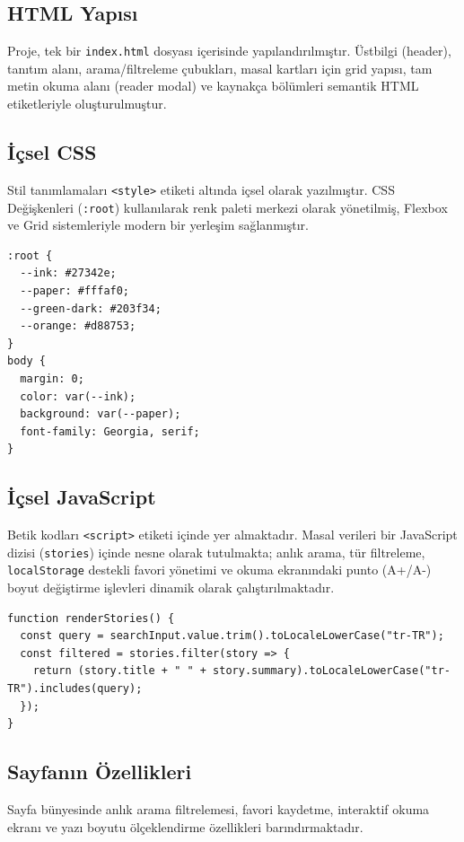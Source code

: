 \documentclass[12pt,a4paper]{article}
\begin{document}
\subsection{HTML Yapısı}
Proje, tek bir \texttt{index.html} dosyası içerisinde yapılandırılmıştır. Üstbilgi (header), tanıtım alanı, arama/filtreleme çubukları, masal kartları için grid yapısı, tam metin okuma alanı (reader modal) ve kaynakça bölümleri semantik HTML etiketleriyle oluşturulmuştur.

\subsection{İçsel CSS}
Stil tanımlamaları \texttt{<style>} etiketi altında içsel olarak yazılmıştır. CSS Değişkenleri (\texttt{:root}) kullanılarak renk paleti merkezi olarak yönetilmiş, Flexbox ve Grid sistemleriyle modern bir yerleşim sağlanmıştır.

\begin{lstlisting}[caption={İçsel CSS'ten örnek bir bölüm}]
:root {
  --ink: #27342e;
  --paper: #fffaf0;
  --green-dark: #203f34;
  --orange: #d88753;
}
body {
  margin: 0;
  color: var(--ink);
  background: var(--paper);
  font-family: Georgia, serif;
}
\end{lstlisting}

\subsection{İçsel JavaScript}
Betik kodları \texttt{<script>} etiketi içinde yer almaktadır. Masal verileri bir JavaScript dizisi (\texttt{stories}) içinde nesne olarak tutulmakta; anlık arama, tür filtreleme, \texttt{localStorage} destekli favori yönetimi ve okuma ekranındaki punto (A+/A-) boyut değiştirme işlevleri dinamik olarak çalıştırılmaktadır.

\begin{lstlisting}[caption={İçsel JavaScript'ten örnek bir bölüm}]
function renderStories() {
  const query = searchInput.value.trim().toLocaleLowerCase("tr-TR");
  const filtered = stories.filter(story => {
    return (story.title + " " + story.summary).toLocaleLowerCase("tr-TR").includes(query);
  });
}
\end{lstlisting}

\subsection{Sayfanın Özellikleri}
Sayfa bünyesinde anlık arama filtrelemesi, favori kaydetme, interaktif okuma ekranı ve yazı boyutu ölçeklendirme özellikleri barındırmaktadır.
\end{document}

